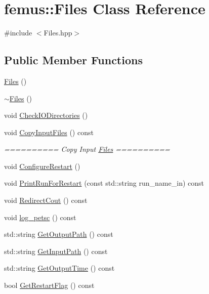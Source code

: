 \hypertarget{classfemus_1_1_files}{}\section{femus\+:\+:Files Class Reference}
\label{classfemus_1_1_files}


{\ttfamily \#include $<$Files.\+hpp$>$}

\subsection*{Public Member Functions}
\begin{DoxyCompactItemize}
\item 
\mbox{\hyperlink{classfemus_1_1_files_ad41837f92d50a4970d4c33fe9888ab74}{Files}} ()
\item 
\mbox{\hyperlink{classfemus_1_1_files_a505d29577f727f29fe9fa34c9396a1b6}{$\sim$\+Files}} ()
\item 
void \mbox{\hyperlink{classfemus_1_1_files_a5f6d341bd11bf8f56891f79607f8c395}{Check\+I\+O\+Directories}} ()
\item 
void \mbox{\hyperlink{classfemus_1_1_files_a513b4baed4cd225643cdaa2c5884de0f}{Copy\+Input\+Files}} () const
\begin{DoxyCompactList}\small\item\em ========== Copy Input \mbox{\hyperlink{classfemus_1_1_files}{Files}} ========== \end{DoxyCompactList}\item 
void \mbox{\hyperlink{classfemus_1_1_files_a38c38ec2557fb275bf3c301f93e9e958}{Configure\+Restart}} ()
\item 
void \mbox{\hyperlink{classfemus_1_1_files_a0b6d9e8921f6e9e8cde6677eb035268d}{Print\+Run\+For\+Restart}} (const std\+::string run\+\_\+name\+\_\+in) const
\item 
void \mbox{\hyperlink{classfemus_1_1_files_ac1aac5a52d5f5479931d238fd72702a6}{Redirect\+Cout}} () const
\item 
void \mbox{\hyperlink{classfemus_1_1_files_ab040fcbe943823f2f0febc9bc0f127a3}{log\+\_\+petsc}} () const
\item 
std\+::string \mbox{\hyperlink{classfemus_1_1_files_acf59b68932959fe552a95acc362c3920}{Get\+Output\+Path}} () const
\item 
std\+::string \mbox{\hyperlink{classfemus_1_1_files_a645fc759501fc3869941f05d916b80e0}{Get\+Input\+Path}} () const
\item 
std\+::string \mbox{\hyperlink{classfemus_1_1_files_a5f9c4c8e7f2d1b2c0273d89f69088d63}{Get\+Output\+Time}} () const
\item 
bool \mbox{\hyperlink{classfemus_1_1_files_a1f3ce268d1166a56a3e3829324a6a2a5}{Get\+Restart\+Flag}} () const
\end{DoxyCompactItemize}
